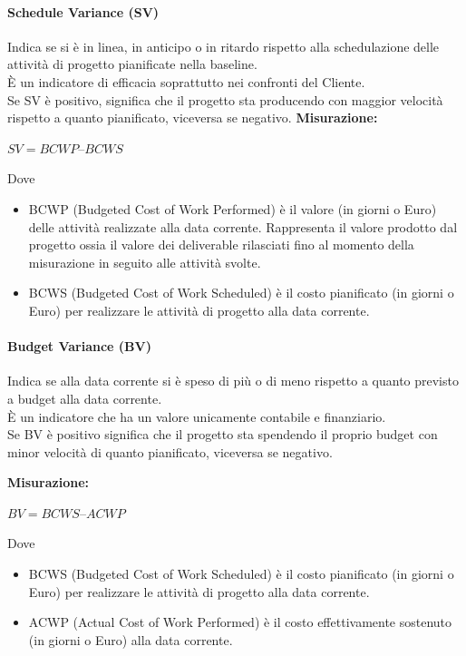 \documentclass[PianoDiQualifica.tex]{subfiles}
\begin{document}
\paragraph{Schedule Variance (SV)}
Indica se si è in linea, in anticipo o in ritardo rispetto alla schedulazione delle attività di progetto pianificate nella baseline.\\
È un indicatore di efficacia soprattutto nei confronti del Cliente. \\
Se SV è positivo, significa che il progetto sta producendo con maggior velocità rispetto a quanto pianificato, viceversa se negativo.
\textbf{Misurazione:}
\begin{center}
	 $ SV = BCWP – BCWS $
\end{center}
Dove \begin{itemize}
	\item BCWP (Budgeted Cost of Work Performed) è il valore (in giorni o Euro) delle attività realizzate alla data corrente.
	Rappresenta il valore prodotto dal progetto ossia il valore dei deliverable rilasciati fino al momento della misurazione in seguito alle attività svolte.
	\item BCWS (Budgeted Cost of Work Scheduled) è il costo pianificato (in giorni o Euro) per realizzare le attività di progetto alla data corrente.
\end{itemize}


\paragraph{Budget Variance (BV)}
Indica se alla data corrente si è speso di più o di meno rispetto a quanto previsto a budget alla data corrente.\\
È un indicatore che ha un valore unicamente contabile e finanziario.\\
Se BV è positivo significa che il progetto sta spendendo il proprio budget con minor velocità di quanto pianificato, viceversa se negativo.

\textbf{Misurazione:}
\begin{center}
	$ BV = BCWS – ACWP $
\end{center}
Dove \begin{itemize}
	\item BCWS (Budgeted Cost of Work Scheduled) è il costo pianificato (in giorni o Euro) per realizzare le attività di progetto alla data corrente.
	\item ACWP (Actual Cost of Work Performed) è il costo effettivamente sostenuto (in giorni o Euro) alla data corrente.
\end{itemize}
\end{document}
